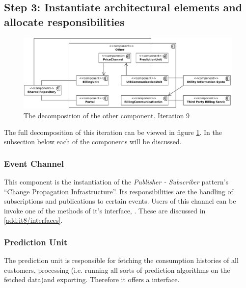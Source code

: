 \subsection{Step 3: Instantiate architectural elements and allocate responsibilities}
\label{add:it10/elements}

\begin{figure}[H]
	\begin{centering}
		\includegraphics[width=\textwidth]{figs/add-it10-elements.pdf}
		\caption{The decomposition of the other component. Iteration
		9}
		\label{fig:add/it10/decomposition}
	\end{centering}
\end{figure}

\npar The full decomposition of this iteration can be viewed in figure
\ref{fig:add/it10/decomposition}. In the subsection below each of the components
will be discussed. 

\subsubsection{Event Channel}

\npar This component is the instantiation of the \emph{Publisher - Subscriber}
pattern's ``Change Propagation Infrastructure''. Its responsibilities are the
handling of subscriptions and publications to certain events. Users of this
channel can be invoke one of the methods of it's interface,
. These are discussed in \ref{add:it8/interfaces}.

\subsubsection{Prediction Unit}

\npar The prediction unit is responsible for fetching the consumption
histories of all customers, processing (i.e. running all sorts of
prediction algorithms on the fetched data)and exporting. Therefore it offers a
 interface.


